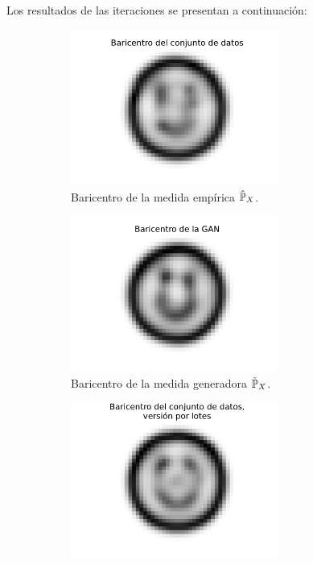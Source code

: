 Los resultados de las iteraciones se presentan a continuación:
\begin{figure}[htbp]
    \centering
    \begin{subfigure}[b]{0.45\textwidth}
        \centering
        \includegraphics[width=0.75\textwidth]{img/barycenters/bar-DS.pdf}
        \caption{Baricentro de la medida empírica $\hat\Prob_X$.}
        \label{fig:bar-DS}
    \end{subfigure}
    \hfill
    \begin{subfigure}[b]{0.45\textwidth}
        \centering
        \includegraphics[width=0.75\textwidth]{img/barycenters/bar-GAN.pdf}
        \caption{Baricentro de la medida generadora $\tilde\Prob_X$.}
        \label{fig:bar-GAN}
    \end{subfigure}
    \newline
    \begin{subfigure}[b]{0.45\textwidth}
        \centering
        \includegraphics[width=0.75\textwidth]{img/barycenters/batch-bar-DS.pdf}

\end{subfigure}
\end{figure}
